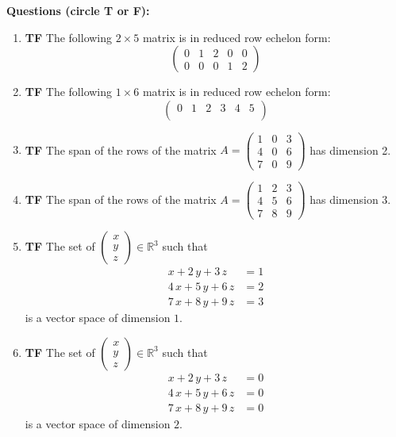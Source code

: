 \documentclass[12pt]{article}
\newcommand{\tf}[1]{\item {\bf {\color{blue}\hspace{1em}T\hspace{1em}F}}\hspace{1em} #1\vspace{1.1ex}}
\newcommand{\R}{\mathbb{R}}
\begin{document}
{\noindent\bf \color{red} Questions (circle T or F):}
\begin{enumerate}

\tf{The following $2\times 5$ matrix is in reduced row echelon form:
$$\left(\begin{array}{rrrrr}
0 & 1 & 2 & 0 & 0\\
0 & 0 & 0 & 1 & 2
\end{array}\right)
$$
}

\tf{The following $1\times 6$ matrix is in reduced row echelon form:
$$\left(\begin{array}{rrrrrr}
0 & 1 & 2 & 3 & 4 & 5\\
\end{array}\right)
$$
}

\tf{The span of the rows of the matrix $A=\left(\begin{array}{rrr}
1 & 0 & 3 \\
4 & 0 & 6 \\
7 & 0 & 9
\end{array}\right)$ has dimension 2.}

\tf{The span of the rows of the matrix $A=\left(\begin{array}{rrr}
1 & 2 & 3 \\
4 & 5 & 6 \\
7 & 8 & 9
\end{array}\right)$ has dimension 3.}

\tf{The set of $\left(\begin{array}{c}
x \\
y\\
z
\end{array}\right)\in \R^3$ such that
\begin{align*}
x + 2 \, y + 3 \, z &= 1 \\
4 \, x + 5 \, y + 6 \, z &= 2\\
7 \, x + 8 \, y + 9 \, z &= 3
\end{align*}
is a vector space of dimension $1$.}

\tf{The set of $\left(\begin{array}{c}
x \\
y\\
z
\end{array}\right)\in \R^3$ such that
\begin{align*}
x + 2 \, y + 3 \, z &= 0 \\
4 \, x + 5 \, y + 6 \, z &= 0\\
7 \, x + 8 \, y + 9 \, z &= 0
\end{align*}
is a vector space of dimension $2$.}


\end{enumerate}
\end{document}
